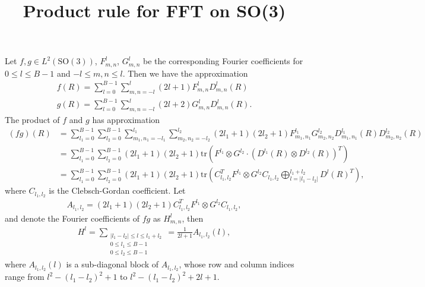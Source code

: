 \documentclass[12pt]{article}
\title{\vspace{-4ex}\textbf{Product rule for FFT on SO(3)\vspace{-4ex}}}
\date{}
\newcommand{\SO}{\ensuremath{\mathrm{SO}(3)}}
\newcommand{\tr}[1]{\ensuremath{\mathrm{tr}\left( #1 \right)}}
\newcommand{\abs}[1]{\ensuremath{\left| #1 \right|}}
\begin{document}
\maketitle

Let $f,g\in L^2(\SO)$, $F_{m,n}^l$, $G_{m,n}^l$ be the corresponding Fourier coefficients for $0\leq l \leq B-1$ and $-l\leq m,n\leq l$.
Then we have the approximation
\begin{align*}
	f(R) = \sum_{l=0}^{B-1} \sum_{m,n=-l}^l (2l+1) F_{m,n}^l D_{m,n}^l(R) \\
	g(R) = \sum_{l=0}^{B-1} \sum_{m,n=-l}^l (2l+2) G_{m,n}^l D_{m,n}^l(R).
\end{align*}
The product of $f$ and $g$ has approximation
\begin{align*}
	(fg)(R) &= \sum_{l_1=0}^{B-1} \sum_{l_2=0}^{B-1} \sum_{m_1,n_1=-l_1}^{l_1} \sum_{m_2,n_2=-l_2}^{l_2} (2l_1+1)(2l_2+1) F_{m_1,n_1}^{l_1} G_{m_2,n_2}^{l_2} D_{m_1,n_1}^{l_1}(R) D_{m_2,n_2}^{l_2}(R) \\
	&= \sum_{l_1=0}^{B-1} \sum_{l_2=0}^{B-1} (2l_1+1)(2l_2+1) \tr{F^{l_1} \otimes G^{l_2} \cdot \left(D^{l_1}(R) \otimes D^{l_2}(R)\right)^T} \\
	&= \sum_{l_1=0}^{B-1} \sum_{l_2=0}^{B-1} (2l_1+1)(2l_2+1) \tr{C_{l_1,l_2}^T F^{l_1} \otimes G^{l_2} C_{l_1,l_2} \bigoplus_{l=\abs{l_1-l_2}}^{l_1+l_2} D^l(R)^T},
\end{align*}
where $C_{l_1,l_2}$ is the Clebsch-Gordan coefficient. 
Let
\begin{align*}
	A_{l_1,l_2} = (2l_1+1)(2l_2+1) C_{l_1,l_2}^T F^{l_1} \otimes G^{l_2} C_{l_1,l_2},
\end{align*}
and denote the Fourier coefficients of $fg$ as $H_{m,n}^l$, then
\begin{align*}
	H^l = \sum_{\substack{\abs{l_1-l_2} \leq l \leq l_1+l_2 \\ 0 \leq l_1 \leq B-1 \\ 0 \leq l_2 \leq B-1}} = \frac{1}{2l+1} A_{l_1,l_2}(l),
\end{align*}
where $A_{l_1,l_2}(l)$ is a sub-diagonal block of $A_{l_1,l_2}$, whose row and column indices range from $l^2-(l_1-l_2)^2+1$ to $l^2-(l_1-l_2)^2+2l+1$.
\end{document}
